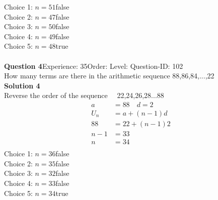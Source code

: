 \documentclass{article}
\begin{document}
Choice 1: \hspace{20pt}$n=51$\hspace{20pt}false\\
Choice 2: \hspace{20pt}$n=47$\hspace{20pt}false\\
Choice 3: \hspace{20pt}$n=50$\hspace{20pt}false\\
Choice 4: \hspace{20pt}$n=49$\hspace{20pt}false\\
Choice 5: \hspace{20pt}$n=48$\hspace{20pt}true\\
\\[4pt]
\noindent\textbf{Question 4}\hspace{20pt}Experience: 35\hspace{20pt}Order: \hspace{20pt}Level: \hspace{20pt}Question-ID: 102\\[2pt]
How many terms are there in the arithmetic sequence 88,86,84,...,22\\[4pt]
\noindent\textbf{Solution 4}\\[2pt]
Reverse the order of the sequence$\quad$ 22,24,26,28...88
\begin{align*}
a&=88 \quad d=2\\[2pt]
U_n&=a+(n-1)d\\[2pt]
88&=22+(n-1)2\\[2pt]
n-1&=33\\[2pt]
n&=34\\[-100pt]
\end{align*}
Choice 1: \hspace{20pt}$n=36$\hspace{20pt}false\\
Choice 2: \hspace{20pt}$n=35$\hspace{20pt}false\\
Choice 3: \hspace{20pt}$n=32$\hspace{20pt}false\\
Choice 4: \hspace{20pt}$n=33$\hspace{20pt}false\\
Choice 5: \hspace{20pt}$n=34$\hspace{20pt}true\\
\end{document}
